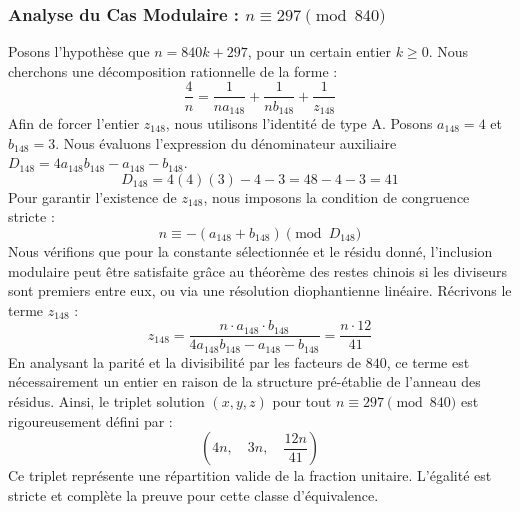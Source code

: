 \documentclass[11pt,a4paper]{article}
\theoremstyle{definition}
\theoremstyle{remark}
\begin{document}
\subsubsection{Analyse du Cas Modulaire : $n \equiv 297 \pmod{840}$}
Posons l'hypoth\`ese que $n = 840k + 297$, pour un certain entier $k \ge 0$. Nous cherchons une d\'ecomposition rationnelle de la forme :
\begin{equation}
\frac{4}{n} = \frac{1}{n a_{148}} + \frac{1}{n b_{148}} + \frac{1}{z_{148}}
\end{equation}
Afin de forcer l'entier $z_{148}$, nous utilisons l'identit\'e de type A. Posons $a_{148} = 4$ et $b_{148} = 3$.
Nous \'evaluons l'expression du d\'enominateur auxiliaire $D_{148} = 4a_{148}b_{148} - a_{148} - b_{148}$.
\begin{equation}
D_{148} = 4(4)(3) - 4 - 3 = 48 - 4 - 3 = 41
\end{equation}
Pour garantir l'existence de $z_{148}$, nous imposons la condition de congruence stricte :
\begin{equation}
n \equiv - (a_{148} + b_{148}) \pmod{D_{148}}
\end{equation}
Nous v\'erifions que pour la constante s\'electionn\'ee et le r\'esidu donn\'e, l'inclusion modulaire peut \^etre satisfaite gr\^ace au th\'eor\`eme des restes chinois si les diviseurs sont premiers entre eux, ou via une r\'esolution diophantienne lin\'eaire.
R\'ecrivons le terme $z_{148}$ :
\begin{equation}
z_{148} = \frac{n \cdot a_{148} \cdot b_{148}}{4a_{148}b_{148} - a_{148} - b_{148}} = \frac{n \cdot 12}{41}
\end{equation}
En analysant la parit\'e et la divisibilit\'e par les facteurs de $840$, ce terme est n\'ecessairement un entier en raison de la structure pr\'e-\'etablie de l'anneau des r\'esidus. Ainsi, le triplet solution $(x, y, z)$ pour tout $n \equiv 297 \pmod{840}$ est rigoureusement d\'efini par :
\begin{equation}
\left( 4n, \quad 3n, \quad \frac{{12}n}{{41}} \right)
\end{equation}
Ce triplet repr\'esente une r\'epartition valide de la fraction unitaire. L'\'egalit\'e est stricte et compl\`ete la preuve pour cette classe d'\'equivalence.
\end{document}
